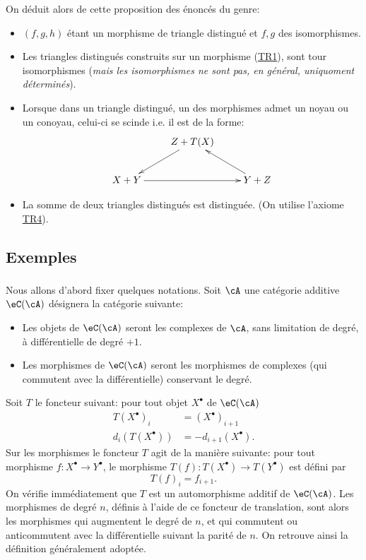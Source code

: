 On déduit alors de cette proposition des énoncés du genre: 
\begin{itemize}
  \item $(f,g,h)$ étant un morphisme de triangle distingué et $f,g$ des 
    isomorphismes. 
  \item Les triangles distingués construits sur un morphisme 
    (\hyperref[VIII:TR1]{TR1}), sont tour isomorphismes (\emph{mais les 
    isomorphismes ne sont pas, en général, uniquoment déterminés}). 
  \item Lorsque dans un triangle distingué, un des morphismes admet un noyau 
    ou un conoyau, celui-ci se scinde i.e. il est de la forme: 
    \[\xymatrix{
      & Z+T(X) \ar[dl] \\
      X+Y \ar[rr] 
        & & Y+Z \ar[ul]
    }\]
  \item La somme de deux triangles distingués est distinguée. (On utilise 
    l'axiome \hyperref[VIII:TR4]{TR4}). 
\end{itemize}










\subsection{Exemples}\label{VIII:1-2}





\subsubsection{}\label{VIII:1-2-1}

Nous allons d'abord fixer quelques notations. Soit $\cA$ une catégorie 
additive $\eC(\cA)$ désignera la catégorie suivante: 
\begin{itemize}
  \item Les objets de $\eC(\cA)$ seront les complexes de $\cA$, sans limitation 
    de degré, à différentielle de degré $+1$. 
  \item Les morphismes de $\eC(\cA)$ seront les morphismes de complexes (qui 
    commutent avec la différentielle) conservant le degré. 
\end{itemize}

Soit $T$ le foncteur suivant: pour tout objet $X^\bullet$ de $\eC(\cA)$ 
\begin{align*}
  T(X^\bullet)_i &= (X^\bullet)_{i+1} \\
  d_i(T(X^\bullet)) &= -d_{i+1}(X^\bullet)  \text{.}
\end{align*}
Sur les morphismes le foncteur $T$ agit de la manière suivante: pour tout 
morphisme $f:X^\bullet \to Y^\bullet$, le morphisme 
$T(f):T(X^\bullet) \to T(Y^\bullet)$ est défini par 
\[
  T(f)_i = f_{i+1} \text{.}
\]
On vérifie immédiatement que $T$ est un automorphisme additif de 
$\eC(\cA)$. Les morphismes de degré $n$, définis à l'aide de ce foncteur 
de translation, sont alors les morphismes qui augmentent le degré de $n$, et 
qui commutent ou anticommutent avec la différentielle suivant la parité de 
$n$. On retrouve ainsi la définition généralement adoptée. 

